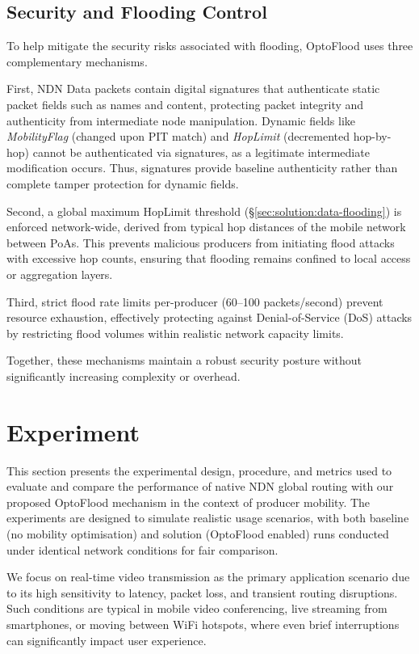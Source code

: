 \documentclass[conference]{IEEEtran}
\begin{document}
\subsection{Security and Flooding Control}

To help mitigate the security risks associated with flooding, OptoFlood uses three complementary mechanisms.

First, NDN Data packets contain digital signatures that authenticate static packet fields such as names and content, protecting packet integrity and authenticity from intermediate node manipulation. Dynamic fields like \textit{MobilityFlag} (changed upon PIT match) and \textit{HopLimit} (decremented hop-by-hop) cannot be authenticated via signatures, as a legitimate intermediate modification occurs. Thus, signatures provide baseline authenticity rather than complete tamper protection for dynamic fields.

Second, a global maximum HopLimit threshold (\S\ref{sec:solution:data-flooding}) is enforced network-wide, derived from typical hop distances of the mobile network between PoAs. This prevents malicious producers from initiating flood attacks with excessive hop counts, ensuring that flooding remains confined to local access or aggregation layers.

Third, strict flood rate limits per-producer (60–100 packets/second) prevent resource exhaustion, effectively protecting against Denial-of-Service (DoS) attacks by restricting flood volumes within realistic network capacity limits.

Together, these mechanisms maintain a robust security posture without significantly increasing complexity or overhead.

\section{Experiment}

This section presents the experimental design, procedure, and metrics used to evaluate and compare the performance of native NDN global routing with our proposed OptoFlood mechanism in the context of producer mobility. The experiments are designed to simulate realistic usage scenarios, with both baseline (no mobility optimisation) and solution (OptoFlood enabled) runs conducted under identical network conditions for fair comparison.

We focus on real-time video transmission as the primary application scenario due to its high sensitivity to latency, packet loss, and transient routing disruptions. Such conditions are typical in mobile video conferencing, live streaming from smartphones, or moving between WiFi hotspots, where even brief interruptions can significantly impact user experience.
\end{document}
